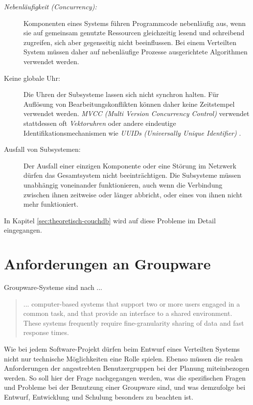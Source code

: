 \begin{description}
  \item[\textit{Nebenläufigkeit (Concurrency):}] Komponenten eines Systems führen Programmcode nebenläufig aus, wenn sie auf gemeinsam genutzte Ressourcen gleichzeitig lesend und schreibend zugreifen, sich aber gegenseitig nicht beeinflussen. Bei einem Verteilten System müssen daher auf nebenläufige Prozesse ausgerichtete Algorithmen verwendet werden.
  \item[Keine globale Uhr:] Die Uhren der Subsysteme lassen sich nicht synchron halten. Für Auflösung von Bearbeitungskonflikten können daher keine Zeitstempel verwendet werden. \textit{MVCC (Multi Version Concurrency Control)} verwendet stattdessen oft \textit{Vektoruhren}  oder andere eindeutige Identifikationsmechanismen wie \textit{UUIDs (Universally Unique Identifier)} \cite{uuids}.
  \item[Ausfall von Subsystemen:] Der Ausfall einer einzigen Komponente oder eine Störung im Netzwerk dürfen das Gesamtsystem nicht beeinträchtigen. Die Subsysteme müssen unabhängig voneinander funktionieren, auch wenn die Verbindung zwischen ihnen zeitweise oder länger abbricht, oder eines von ihnen nicht mehr funktioniert.
\end{description}

In Kapitel \ref{sec:theoretisch-couchdb} wird auf diese Probleme im Detail eingegangen.


\section{Anforderungen an Groupware}

Groupware-Systeme sind nach  ...

\begin{quote}
... computer-based systems that support two or more users engaged
in a common task, and that provide an interface to a shared environment. These systems frequently require fine-granularity sharing of data and fast response times.
\end{quote}

Wie bei jedem Software-Projekt dürfen beim Entwurf eines Verteilten Systems nicht nur technische Möglichkeiten eine Rolle spielen. Ebenso müssen die realen Anforderungen der angestrebten Benutzergruppen bei der Planung miteinbezogen werden. So soll hier der Frage nachgegangen werden, was die spezifischen Fragen und Probleme bei der Benutzung einer Groupware sind, und was demzufolge bei Entwurf, Entwicklung und Schulung besonders zu beachten ist. 

